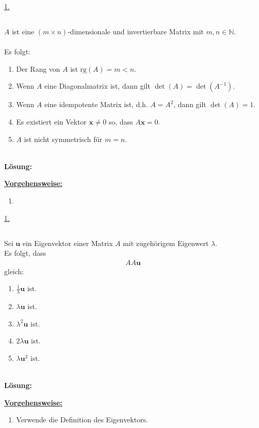 \underline{1. }\\


\newpage
\subsection*{}
$A$ ist eine $(m \times n)$-dimensionale und invertierbare Matrix mit $m,n \in \mathbb{N}$.\\
\\
Es folgt:
\renewcommand{\labelenumi}{(\alph{enumi})}
\begin{enumerate}
	\item 
	Der Rang von $A$ ist $\mathrm{rg}(A) = m < n$.
	\item 
	Wenn $A$ eine Diagonalmatrix ist, dann gilt $\det(A) = \det(A^{-1})$.
	\item 
	Wenn $A$ eine idempotente Matrix ist, d.h. $A = A^2$, dann gilt $\det(A) = 1$.
	\item 
	Es existiert ein Vektor $\mathbf{x} \neq 0$ so, dass $A \mathbf{x} = 0$.
	\item 
	$A$ ist nicht symmetrisch  für $m=n$. 
\end{enumerate}
\ \\
\textbf{Lösung:}
\begin{mdframed}
\underline{\textbf{Vorgehensweise:}}
\renewcommand{\labelenumi}{\theenumi.}
\begin{enumerate}
\item 
\end{enumerate}
\end{mdframed}

\underline{1. }\\

\newpage

\subsection*{}
Sei $\mathbf{u} $ ein Eigenvektor einer Matrix $A$ mit zugehörigem Eigenwert $\lambda$.
\\
Es folgt, dass 
\begin{align*}
	AA \mathbf{u}
\end{align*}
gleich:
\renewcommand{\labelenumi}{(\alph{enumi})}
\begin{enumerate}
	\item 
	$ \frac{1}{\lambda} \mathbf{u} $ ist.
	\item 
	$ \lambda \mathbf{u} $ ist.
	\item
	$ \lambda^2 \mathbf{u}$ ist.
	\item
	$ 2\lambda \mathbf{u} $ ist.
	\item 
	$ \lambda \mathbf{u}^2 $ ist.
\end{enumerate}
\ \\
\textbf{Lösung:}
\begin{mdframed}
\underline{\textbf{Vorgehensweise:}}
\renewcommand{\labelenumi}{\theenumi.}
\begin{enumerate}
\item Verwende die Definition des Eigenvektors.
\end{enumerate}
\end{mdframed}

